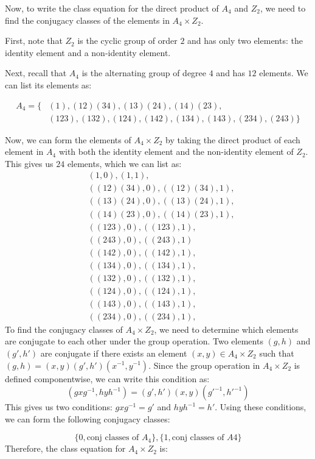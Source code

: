 \documentclass[12pt]{report}
\begin{document}
Now, to write the class equation for the direct product of $A_4$ and $Z_2$, we need to find the conjugacy classes of the elements in $A_4 \times Z_2$.

First, note that $Z_2$ is the cyclic group of order $2$ and has only two elements: the identity element and a non-identity element.

Next, recall that $A_4$ is the alternating group of degree $4$ and has $12$ elements. We can list its elements as:

\begin{align*}
A_4 = \{&(1), (12)(34), (13)(24), (14)(23), \\
&(123), (132), (124), (142), (134), (143), (234), (243)\}
\end{align*}

Now, we can form the elements of $A_4 \times Z_2$ by taking the direct product of each element in $A_4$ with both the identity element and the non-identity element of $Z_2$. This gives us $24$ elements, which we can list as:
\begin{align*}
&(1,0), (1,1), \\
&((12)(34),0), ((12)(34),1), \\
&((13)(24),0), ((13)(24),1), \\
&((14)(23),0), ((14)(23),1), \\
&((123),0), ((123),1), \\
&((243),0), ((243),1) \\
&((142),0), ((142),1), \\
&((134),0), ((134),1), \\
&((132),0), ((132),1), \\
&((124),0), ((124),1), \\
&((143),0), ((143),1), \\
&((234),0), ((234),1),
\end{align*}
To find the conjugacy classes of $A_4 \times Z_2$, we need to determine which elements are conjugate to each other under the group operation. Two elements $(g,h)$ and $(g',h')$ are conjugate if there exists an element $(x,y) \in A_4 \times Z_2$ such that $(g,h) = (x,y)(g',h')(x^{-1},y^{-1})$.
Since the group operation in $A_4 \times Z_2$ is defined componentwise, we can write this condition as:
$$(gxg^{-1}, hyh^{-1}) = (g',h')(x,y)(g'^{-1},h'^{-1})$$
This gives us two conditions: $gxg^{-1} = g'$ and $hyh^{-1} = h'$.
Using these conditions, we can form the following conjugacy classes:

$$\{0, \text{conj classes of } A_4\}, \{1, \text{conj classes of } A4\}$$
Therefore, the class equation for $A_4 \times Z_2$ is:
\end{document}
